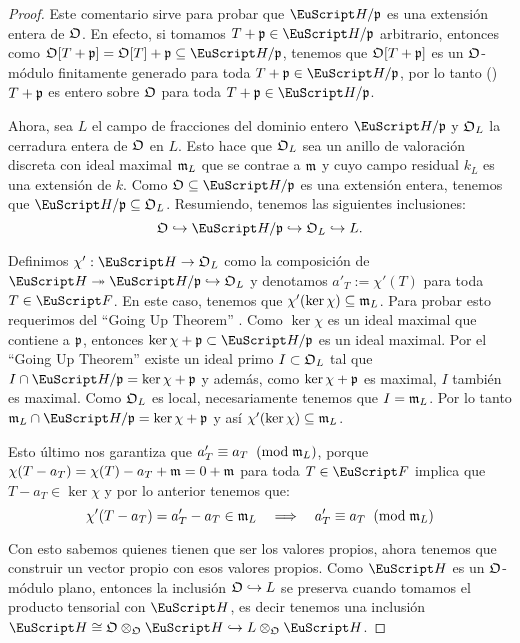 \documentclass[../../tesis_maestria]{subfiles}
\begin{document}
\begin{proof}
  Este comentario sirve para probar que $\Hh/\p$ es una extensi\'on entera de $\mathfrak{O}$. En efecto,
  si tomamos $T+\p\in\Hh/\p$ arbitrario, entonces como $\fO[T+\p]=\fO[T]+\p\subseteq\Hh/\p$,
  tenemos que $\mathfrak{O}[T+\mathfrak{p}]$ es un $\mathfrak{O}$-m\'odulo finitamente generado para toda $T+\p\in\Hh/\p$,
  por lo tanto (\cite[\S5, Proposici\'on 5.1]{AtiyahITCA}) $T+\mathfrak{p}$ es entero sobre $\mathfrak{O}$ para toda
  $T+\p\in\Hh/\p$.

  Ahora, sea $L$ el campo de fracciones del dominio entero $\Hh/\p$ y $\mathfrak{O}_L$ la cerradura
  entera de $\mathfrak{O}$ en $L$. Esto hace que $\mathfrak{O}_L$ sea un anillo de valoraci\'on discreta con
  ideal maximal $\mathfrak{m}_L$ que se contrae a $\mathfrak{m}$ y cuyo campo residual $k_L$ es una extensi\'on de $k$.
  Como $\fO\subseteq\Hh/\p$ es una extensi\'on entera, tenemos que $\Hh/\p\subseteq\fO_L$.
  Resumiendo, tenemos las siguientes inclusiones:
  \[
    \fO\hookrightarrow \Hh/\p \hookrightarrow \fO_L \hookrightarrow L.
  \]

  Definimos $\chi':\Hh\ra\fO_L$ como la composici\'on de $\Hh\epi\Hh/\p\hookrightarrow\fO_L$
  y denotamos $a'_T:=\chi'(T)$ para toda $T\in\Ff$. En este caso, tenemos que
  $\chi'(\ker\chi)\subseteq\mathfrak{m}_L$. Para probar esto requerimos del ``Going Up Theorem''
  \cite[proposici\'on 4.15 y corolario 4.17]{EisenbudCAWAVTAG}. Como $\ker\chi$ es un ideal
  maximal que contiene a $\mathfrak{p}$, entonces $\ker\chi+\p\subset\Hh/\p$ es un ideal maximal. Por
  el ``Going Up Theorem'' existe un ideal primo $I\subset\mathfrak{O}_L$ tal que $I\cap\Hh/\p=\ker\chi+\p$
  y adem\'as, como $\ker\chi+\mathfrak{p}$ es maximal, $I$ tambi\'en es maximal. Como $\mathfrak{O}_L$ es local,
  necesariamente tenemos que $I=\mathfrak{m}_L$. Por lo tanto $\m_L\cap\Hh/\p=\ker\chi+\p$ y as\'i
  $\chi'(\ker\chi)\subseteq\mathfrak{m}_L$.

  Esto \'ultimo nos garantiza que $a'_T\equiv a_T\;\;(\mathrm{mod}\; \mathfrak{m}_L)$, porque
  $\chi(T-a_T)=\chi(T)-a_T+\mathfrak{m}=0+\mathfrak{m}$ para toda $T\in\Ff$ implica que $T-a_T\in\ker\chi$ y por lo
  anterior tenemos que:
  \begin{equation}\label{eqn:eigenvalorescoincidenmodm}
    \chi'(T-a_T)=a'_T-a_T\in\mathfrak{m}_L \quad\Longrightarrow\quad a'_T\equiv a_T\;\;(\mathrm{mod}\; \mathfrak{m}_L)
  \end{equation}
 
  Con esto sabemos quienes tienen que ser los valores propios, ahora tenemos que
  construir un
  vector propio con esos valores propios. Como $\Hh$ es un $\mathfrak{O}$-m\'odulo plano, entonces
  la inclusi\'on $\mathfrak{O}\hookrightarrow L$
  se preserva cuando tomamos el producto tensorial con $\Hh$, es decir tenemos una inclusi\'on
  $\Hh\cong\fO\otimes_{\fO}\Hh\hookrightarrow L\otimes_{\fO}\Hh$.


\end{proof}
\end{document}
